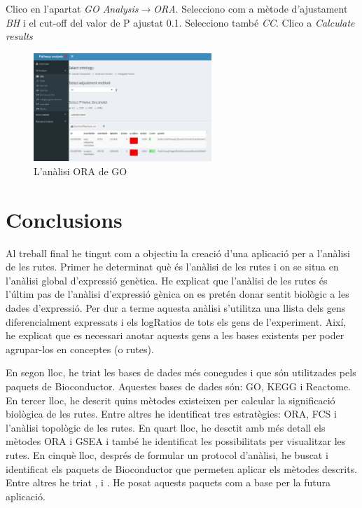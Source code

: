 Clico en l'apartat \textit{\gls{GO} Analysis}$\rightarrow$\textit{ORA}. Selecciono com a mètode d'ajustament \textit{BH} i el cut-off del valor de P ajustat 0.1. Selecciono també \textit{CC}. Clico a \textit{Calculate results}
\begin{figure}[H]
\centering
\includegraphics[width=0.6\textwidth]{figures/Estudi1_Fig13_GO.png} 
\caption{L'anàlisi \gls{ORA} de \gls{GO}}
\end{figure}

\chapter{Conclusions}

Al treball final he tingut com a objectiu la creació d'una aplicació per a l’anàlisi de les rutes. Primer he determinat què és l'anàlisi de les rutes i on se situa en l'anàlisi global d'expressió genètica. He explicat que l'anàlisi de les rutes és l'últim pas de l'anàlisi d'expressió gènica on es pretén donar sentit biològic a les dades d'expressió. Per dur a terme aquesta anàlisi s'utilitza una llista dels gens diferencialment expressats i els \gls{logRatio}s de tots els gens de l'experiment. Així, he explicat que es necessari anotar aquests gens a les bases existents per poder agrupar-los en conceptes (o rutes). 

En segon lloc, he triat les bases de dades més conegudes i que són utilitzades pels paquets de \gls{Bioconductor}. Aquestes bases de dades són: \gls{GO}, \gls{KEGG} i Reactome. En tercer lloc, he descrit quins mètodes existeixen per calcular la significació biològica de les rutes. Entre altres he identificat tres estratègies: \gls{ORA}, \gls{FCS} i l'anàlisi topològic de les rutes. En quart lloc, he desctit amb més detall els mètodes \gls{ORA} i \gls{GSEA} i també he identificat les possibilitats per visualitzar les rutes. En cinquè lloc, després de formular un protocol d'anàlisi, he buscat i identificat els paquets de \gls{Bioconductor} que permeten aplicar els mètodes descrits. Entre altres he triat ,  i . He posat aquests paquets com a base per la futura aplicació. 

